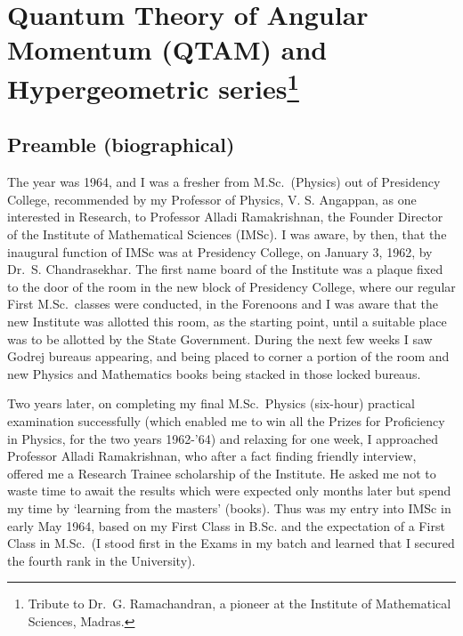 \chapter[Quantum Theory of Angular Momentum and\hfil\break Hypergeometric series]{Quantum Theory of Angular Momentum (QTAM) and Hypergeometric series\footnote[*]{Tribute to Dr.\ G. Ramachandran, a pioneer at the Institute of Mathematical Sciences, Madras.}}\label{chap7}



\section*{Preamble (biographical)}

The year was 1964, and I was a fresher from M.Sc.\ (Physics) out of Presidency College, recommended by my Professor of Physics, V. S. Angappan, as one interested in Research, to Professor Alladi Ramakrishnan, the Founder Director of the Institute of Mathematical Sciences (IMSc). I was aware, by then, that the inaugural function of IMSc was at Presidency College, on January 3, 1962, by Dr.\ S. Chandrasekhar. The first name board of the Institute was a plaque fixed to the door of the room in the new block of Presidency College, where our regular First M.Sc.\ classes were conducted, in the Forenoons and I was aware that the new Institute was allotted this room, as the starting point, until a suitable place was to be allotted by the State Government. During the next few weeks I saw Godrej bureaus appearing, and being placed to corner a portion of the room and new Physics and Mathematics books being stacked in those locked bureaus.
\newpage

Two years later, on completing my final M.Sc.\ Physics (six-hour) practical examination successfully (which enabled me to win all the Prizes for Proficiency in Physics, for the two years 1962-'64) and relaxing for one week, I approached Professor Alladi Ramakrishnan, who after a fact finding friendly interview, offered me a Research Trainee scholarship of the Institute. He asked me not to waste time to await the results which were expected only months later but spend my time by `learning from the masters' (books). Thus was my entry into IMSc in early May 1964, based on my First Class in B.Sc. and the expectation of a First Class in M.Sc.\ (I stood first in the Exams in my batch and learned that I secured the fourth rank in the University).

